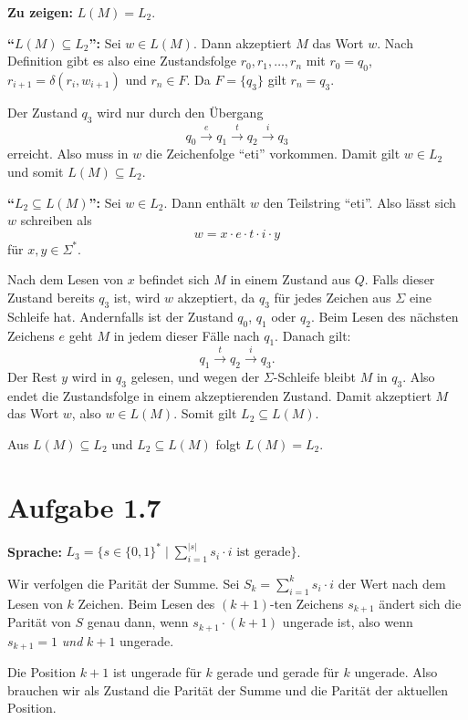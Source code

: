\documentclass[a4paper,12pt]{article}
\begin{document}
\textbf{Zu zeigen:} $L(M) = L_2$.

\medskip
\textbf{``$L(M) \subseteq L_2$'':}
Sei $w \in L(M)$. Dann akzeptiert $M$ das Wort $w$.
Nach Definition gibt es also eine Zustandsfolge $r_0,r_1,\ldots,r_n$ mit $r_0=q_0$, $r_{i+1}=\delta(r_i,w_{i+1})$ und $r_n \in F$.
Da $F=\{q_3\}$ gilt $r_n=q_3$.

Der Zustand $q_3$ wird nur durch den Übergang
\[
q_0 \xrightarrow{e} q_1 \xrightarrow{t} q_2 \xrightarrow{i} q_3
\]
erreicht.
Also muss in $w$ die Zeichenfolge ``eti'' vorkommen.
Damit gilt $w \in L_2$ und somit $L(M) \subseteq L_2$.

\medskip
\textbf{``$L_2 \subseteq L(M)$'':}
Sei $w \in L_2$. Dann enthält $w$ den Teilstring ``eti''.
Also lässt sich $w$ schreiben als
\[
w = x \cdot e \cdot t \cdot i \cdot y
\]
für $x,y \in \Sigma^*$.

Nach dem Lesen von $x$ befindet sich $M$ in einem Zustand aus $Q$.
Falls dieser Zustand bereits $q_3$ ist, wird $w$ akzeptiert, da $q_3$ für jedes Zeichen aus $\Sigma$ eine Schleife hat.
Andernfalls ist der Zustand $q_0$, $q_1$ oder $q_2$.
Beim Lesen des nächsten Zeichens $e$ geht $M$ in jedem dieser Fälle nach $q_1$.
Danach gilt:
\[
q_1 \xrightarrow{t} q_2 \xrightarrow{i} q_3.
\]
Der Rest $y$ wird in $q_3$ gelesen, und wegen der $\Sigma$-Schleife bleibt $M$ in $q_3$.
Also endet die Zustandsfolge in einem akzeptierenden Zustand.
Damit akzeptiert $M$ das Wort $w$, also $w \in L(M)$.
Somit gilt $L_2 \subseteq L(M)$.

\medskip
Aus $L(M) \subseteq L_2$ und $L_2 \subseteq L(M)$ folgt $L(M)=L_2$.

\section*{Aufgabe 1.7}

\textbf{Sprache:} $L_3 = \{s \in \{0,1\}^* \mid \sum_{i=1}^{|s|} s_i \cdot i \text{ ist gerade}\}$.

Wir verfolgen die Parität der Summe. Sei $S_k = \sum_{i=1}^{k} s_i \cdot i$ der Wert nach dem Lesen von $k$ Zeichen. Beim Lesen des $(k+1)$-ten Zeichens $s_{k+1}$ ändert sich die Parität von $S$ genau dann, wenn $s_{k+1} \cdot (k+1)$ ungerade ist, also wenn $s_{k+1} = 1$ \emph{und} $k+1$ ungerade.

Die Position $k+1$ ist ungerade für $k$ gerade und gerade für $k$ ungerade. Also brauchen wir als Zustand die Parität der Summe und die Parität der aktuellen Position.
\end{document}
